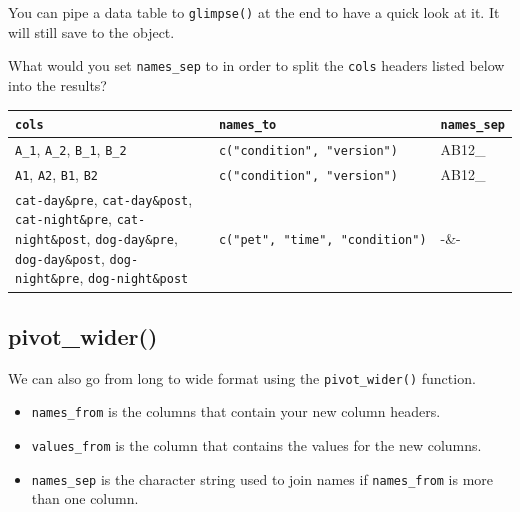 \documentclass[
  oneside]{book}
\providecommand{\tightlist}{%
  \setlength{\itemsep}{0pt}\setlength{\parskip}{0pt}}
\begin{document}
\begin{info}
You can pipe a data table to \texttt{glimpse()} at the end to have a quick look at it. It will still save to the object.

\end{info}

\begin{try}

What would you set \texttt{names\_sep} to in order to split the \texttt{cols} headers listed below into the results?

\begin{longtable}[]{@{}
  >{\raggedright\arraybackslash}p{}
  >{\raggedright\arraybackslash}p{}
  >{\raggedright\arraybackslash}p{}@{}}
\toprule
\texttt{cols} & \texttt{names\_to} & \texttt{names\_sep} \\
\midrule
\endhead
\texttt{A\_1}, \texttt{A\_2}, \texttt{B\_1}, \texttt{B\_2} & \texttt{c("condition",\ "version")} & AB12\_ \\
\texttt{A1}, \texttt{A2}, \texttt{B1}, \texttt{B2} & \texttt{c("condition",\ "version")} & AB12\_ \\
\texttt{cat-day\&pre}, \texttt{cat-day\&post}, \texttt{cat-night\&pre}, \texttt{cat-night\&post}, \texttt{dog-day\&pre}, \texttt{dog-day\&post}, \texttt{dog-night\&pre}, \texttt{dog-night\&post} & \texttt{c("pet",\ "time",\ "condition")} & -\&- \\
\bottomrule
\end{longtable}

\end{try}

\hypertarget{pivot_wider}{%
\subsection{pivot\_wider()}\label{pivot_wider}}

We can also go from long to wide format using the \texttt{pivot\_wider()} function.

\begin{itemize}
\tightlist
\item
  \texttt{names\_from} is the columns that contain your new column headers.
\item
  \texttt{values\_from} is the column that contains the values for the new columns.
\item
  \texttt{names\_sep} is the character string used to join names if \texttt{names\_from} is more than one column.
\end{itemize}
\end{document}
